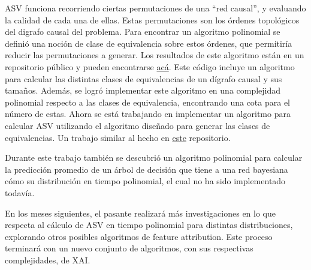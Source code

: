 \documentclass[10pt,a4paper]{article}
\newcommand{\echu}[1]{\todo[inline,caption={},color=blue!30]{{\bf Echu:} #1}}
\newcommand{\sidesergio}[1]{\todo[caption={},color=green!30, size=\footnotesize]{{\bf Sergio:} #1}}
\begin{document}
ASV funciona recorriendo ciertas permutaciones de una ``red causal'', y evaluando la calidad de cada una de ellas. Estas permutaciones son los órdenes topológicos del digrafo causal del problema. Para encontrar un algoritmo polinomial se definió una noción de  clase de equivalencia sobre estos órdenes, que permitiría reducir las permutaciones a generar. Los resultados de este algoritmo están en un repositorio público y pueden encontrarse \href{https://github.com/EchuCompa/pasantia-BICC}{acá}. Este código incluye un algoritmo para calcular las distintas clases de equivalencias de un dígrafo causal y sus tamaños. %
Además, se logró implementar este algoritmo en una complejidad polinomial respecto a las clases de equivalencia, encontrando una cota para el número de estas. Ahora se está trabajando en implementar un algoritmo para calcular ASV utilizando el algoritmo diseñado para generar las clases de equivalencias. Un trabajo similar al hecho en \href{https://github.com/nredell/shapFlex/tree/master}{este} repositorio. %

Durante este trabajo también se descubrió un algoritmo polinomial para calcular la predicción promedio de un árbol de decisión que tiene a una red bayesiana cómo su distribución en tiempo polinomial, el cual no ha sido implementado todavía.  

En los meses siguientes, el pasante realizará más investigaciones en lo que respecta al cálculo de ASV en tiempo polinomial para distintas distribuciones, explorando otros posibles algoritmos de feature attribution. Este proceso terminará con un nuevo conjunto de algoritmos, con sus respectivas complejidades, de XAI.

\printbibliography

\end{document}
